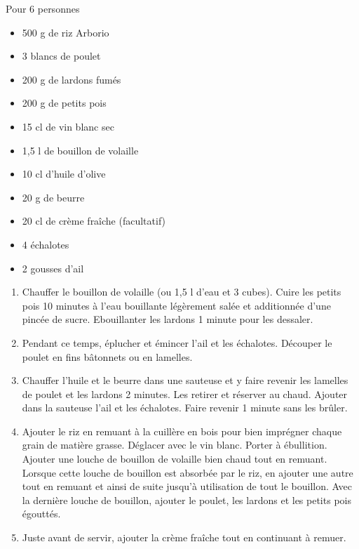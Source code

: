 \bigskip
{}
{Pour 6 personnes}{\begin{itemize}
	\item 500 g de riz Arborio
	\item 3 blancs de poulet
	\item 200 g de lardons fumés
	\item 200 g de petits pois
	\item 15 cl de vin blanc sec
	\item 1,5 l de bouillon de volaille
	\item 10 cl d'huile d'olive
	\item 20 g de beurre
	\item 20 cl de crème fraîche (facultatif)
	\item 4 échalotes
	\item 2 gousses d'ail
\end{itemize}}
{\begin{enumerate}
	\item Chauffer le bouillon de volaille (ou 1,5 l d'eau et 3 cubes). Cuire les petits pois 10 minutes à l'eau bouillante légèrement salée et additionnée d'une pincée de sucre. Ebouillanter les lardons 1 minute pour les dessaler.
	\item Pendant ce temps, éplucher et émincer l'ail et les échalotes. Découper le poulet en fins bâtonnets ou en lamelles.
	\item Chauffer l'huile et le beurre dans une sauteuse et y faire revenir les lamelles de poulet et les lardons 2 minutes. Les retirer et réserver au chaud. Ajouter dans la sauteuse l'ail et les échalotes. Faire revenir 1 minute sans les brûler.
	\item Ajouter le riz en remuant à la cuillère en bois pour bien imprégner chaque grain de matière grasse. Déglacer avec le vin blanc. Porter à ébullition. Ajouter une louche de bouillon de volaille bien chaud tout en remuant. Lorsque cette louche de bouillon est absorbée par le riz, en ajouter une autre tout en remuant et ainsi de suite jusqu'à utilisation de tout le bouillon. Avec la dernière louche de bouillon, ajouter le poulet, les lardons et les petits pois égouttés.
	\item Juste avant de servir, ajouter la crème fraîche tout en continuant à remuer. 
\end{enumerate}}

